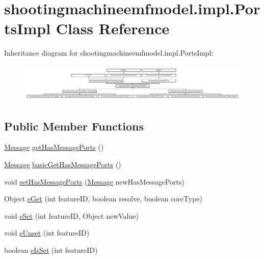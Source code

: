 \hypertarget{classshootingmachineemfmodel_1_1impl_1_1_ports_impl}{\section{shootingmachineemfmodel.\-impl.\-Ports\-Impl Class Reference}
\label{classshootingmachineemfmodel_1_1impl_1_1_ports_impl}
}
Inheritance diagram for shootingmachineemfmodel.\-impl.\-Ports\-Impl\-:\begin{figure}[H]
\begin{center}
\leavevmode
\includegraphics[height=1.872910cm]{classshootingmachineemfmodel_1_1impl_1_1_ports_impl}
\end{center}
\end{figure}
\subsection*{Public Member Functions}
\begin{DoxyCompactItemize}
\item 
\hyperlink{interfaceshootingmachineemfmodel_1_1_message}{Message} \hyperlink{classshootingmachineemfmodel_1_1impl_1_1_ports_impl_a8a87593dadc10c56c8a0e5a67ecaafbe}{get\-Has\-Message\-Ports} ()
\item 
\hyperlink{interfaceshootingmachineemfmodel_1_1_message}{Message} \hyperlink{classshootingmachineemfmodel_1_1impl_1_1_ports_impl_ad069632bd6497fa0b6a1448346c8b74a}{basic\-Get\-Has\-Message\-Ports} ()
\item 
void \hyperlink{classshootingmachineemfmodel_1_1impl_1_1_ports_impl_a16e38e5df0bfff46205009ebcedf6957}{set\-Has\-Message\-Ports} (\hyperlink{interfaceshootingmachineemfmodel_1_1_message}{Message} new\-Has\-Message\-Ports)
\item 
Object \hyperlink{classshootingmachineemfmodel_1_1impl_1_1_ports_impl_ac88017314b3fd0bb76ba9cf750a476c6}{e\-Get} (int feature\-I\-D, boolean resolve, boolean core\-Type)
\item 
void \hyperlink{classshootingmachineemfmodel_1_1impl_1_1_ports_impl_ac3c0b53cdf75fbd99f4c35c84d0b56cd}{e\-Set} (int feature\-I\-D, Object new\-Value)
\item 
void \hyperlink{classshootingmachineemfmodel_1_1impl_1_1_ports_impl_a39689d056a5cc80fe12f0893e143b87c}{e\-Unset} (int feature\-I\-D)
\item 
boolean \hyperlink{classshootingmachineemfmodel_1_1impl_1_1_ports_impl_a0e44635bf6489a6964af2133cb53b069}{e\-Is\-Set} (int feature\-I\-D)
\end{DoxyCompactItemize}
